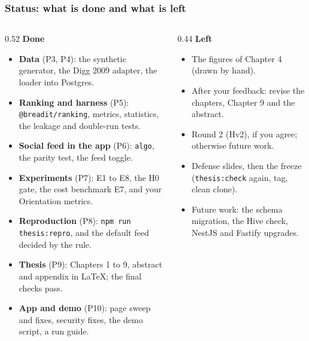 \documentclass[aspectratio=169,11pt]{beamer}
\begin{document}
\begin{frame}
  \frametitle{Status: what is done and what is left}
  \begin{columns}[T]
    \begin{column}{0.52\textwidth}
      \textbf{Done}
      \begin{itemize}\footnotesize
        \item \textbf{Data} (P3, P4): the synthetic generator, the Digg 2009 adapter, the loader into Postgres.
        \item \textbf{Ranking and harness} (P5): \texttt{@breadit/ranking}, metrics, statistics, the leakage and double-run tests.
        \item \textbf{Social feed in the app} (P6): \texttt{algo}, the parity test, the feed toggle.
        \item \textbf{Experiments} (P7): E1 to E8, the H0 gate, the cost benchmark E7, and your Orientation metrics.
        \item \textbf{Reproduction} (P8): \texttt{npm run thesis:repro}, and the default feed decided by the rule.
        \item \textbf{Thesis} (P9): Chapters 1 to 9, abstract and appendix in LaTeX; the final checks pass.
        \item \textbf{App and demo} (P10): page sweep and fixes, security fixes, the demo script, a run guide.
      \end{itemize}
    \end{column}
    \begin{column}{0.44\textwidth}
      \textbf{Left}
      \begin{itemize}\footnotesize
        \item The figures of Chapter 4 (drawn by hand).
        \item After your feedback: revise the chapters, Chapter 9 and the abstract.
        \item Round 2 (Hv2), if you agree; otherwise future work.
        \item Defense slides, then the freeze (\texttt{thesis:check} again, tag, clean clone).
        \item Future work: the schema migration, the Hive check, NestJS and Fastify upgrades.
      \end{itemize}
    \end{column}
  \end{columns}
\end{frame}
\end{document}
